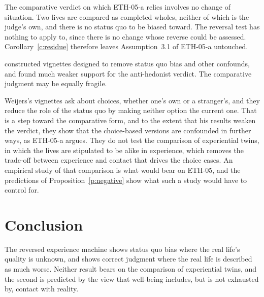 \documentclass{situationist-preprint}
\begin{document}
The comparative verdict on which ETH-05-a relies involves no change of situation. Two lives are compared as completed wholes, neither of which is the judge's own, and there is no status quo to be biased toward. The reversal test has nothing to apply to, since there is no change whose reverse could be assessed. Corollary~\ref{c:residue} therefore leaves Assumption~3.1 of ETH-05-a untouched.

\begin{objection}
\citet{Weijers2014} constructed vignettes designed to remove status quo bias and other confounds, and found much weaker support for the anti-hedonist verdict. The comparative judgment may be equally fragile.
\end{objection}

\begin{reply}
Weijers's vignettes ask about choices, whether one's own or a stranger's, and they reduce the role of the status quo by making neither option the current one. That is a step toward the comparative form, and to the extent that his results weaken the verdict, they show that the choice-based versions are confounded in further ways, as ETH-05-a argues. They do not test the comparison of experiential twins, in which the lives are stipulated to be alike in experience, which removes the trade-off between experience and contact that drives the choice cases. An empirical study of that comparison is what would bear on ETH-05, and the predictions of Proposition~\ref{p:negative} show what such a study would have to control for.
\end{reply}

\section{Conclusion}

The reversed experience machine shows status quo bias where the real life's quality is unknown, and shows correct judgment where the real life is described as much worse. Neither result bears on the comparison of experiential twins, and the second is predicted by the view that well-being includes, but is not exhausted by, contact with reality.
\end{document}
